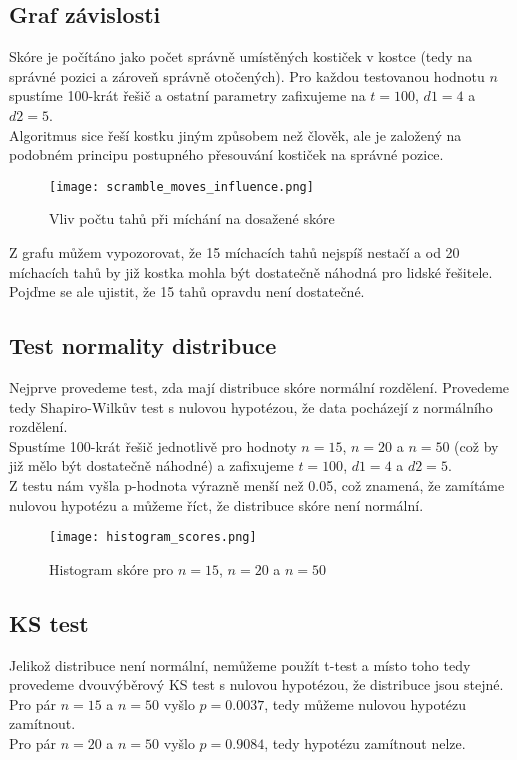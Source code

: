 \documentclass{article}
\begin{document}
\subsection*{Graf závislosti}
Skóre je počítáno jako počet správně umístěných kostiček v kostce (tedy na správné pozici a zároveň správně otočených).
Pro každou testovanou hodnotu $n$ spustíme 100-krát řešič a ostatní parametry zafixujeme na
$t = 100$, $d1 = 4$ a $d2 = 5$.\\
Algoritmus sice řeší kostku jiným způsobem než člověk, ale je založený na podobném principu 
postupného přesouvání kostiček na správné pozice.

\begin{figure}[h]
    \centering
    \texttt{[image: scramble\_moves\_influence.png]}
    \caption{Vliv počtu tahů při míchání na dosažené skóre}
    \label{fig:scramble_moves_influence}
\end{figure}

Z grafu můžem vypozorovat, že 15 míchacích tahů nejspíš nestačí a od 20 míchacích
tahů by již kostka mohla být dostatečně náhodná pro lidské řešitele.\\
Pojďme se ale ujistit, že 15 tahů opravdu není dostatečné.

\subsection*{Test normality distribuce}
Nejprve provedeme test, zda mají distribuce skóre normální rozdělení.
Provedeme tedy Shapiro-Wilkův test s nulovou hypotézou, že data pocházejí z normálního rozdělení.\\
Spustíme 100-krát řešič jednotlivě pro hodnoty $n = 15$, $n = 20$ a $n = 50$ (což by již mělo být dostatečně náhodné)
a zafixujeme $t = 100$, $d1 = 4$ a $d2 = 5$.\\
Z testu nám vyšla p-hodnota výrazně menší než 0.05, což znamená, že zamítáme nulovou hypotézu a 
můžeme říct, že distribuce skóre není normální.\\

\begin{figure}[h]
    \centering
    \texttt{[image: histogram\_scores.png]}
    \caption{Histogram skóre pro $n = 15$, $n = 20$ a $n = 50$}
    \label{fig:histogram_scores}
\end{figure}

\subsection*{KS test}
Jelikož distribuce není normální, nemůžeme použít t-test a místo toho tedy provedeme
dvouvýběrový KS test s nulovou hypotézou, že distribuce jsou stejné.\\
Pro pár $n = 15$ a $n = 50$ vyšlo $p=0.0037$, tedy můžeme nulovou hypotézu zamítnout.\\
Pro pár $n = 20$ a $n = 50$ vyšlo $p=0.9084$, tedy hypotézu zamítnout nelze.
\end{document}
